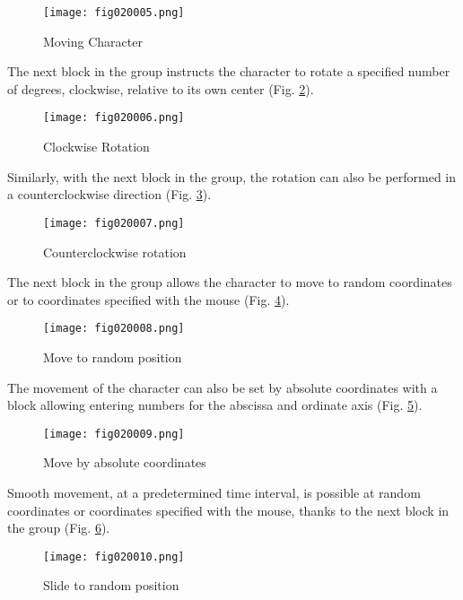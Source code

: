 \begin{figure}[H]
   \centering
   \texttt{[image: fig020005.png]}
   \caption{Moving Character}
\label{fig020005}
\end{figure}

The next block in the group instructs the character to rotate a specified number of degrees, clockwise, relative to its own center (Fig. \ref{fig020006}).

\begin{figure}[H]
   \centering
   \texttt{[image: fig020006.png]}
   \caption{Clockwise Rotation}
\label{fig020006}
\end{figure}

Similarly, with the next block in the group, the rotation can also be performed in a counterclockwise direction (Fig. \ref{fig020007}).

\begin{figure}[H]
   \centering
   \texttt{[image: fig020007.png]}
   \caption{Counterclockwise rotation}
\label{fig020007}
\end{figure}

The next block in the group allows the character to move to random coordinates or to coordinates specified with the mouse (Fig. \ref{fig020008}).

\begin{figure}[H]
   \centering
   \texttt{[image: fig020008.png]}
   \caption{Move to random position}
\label{fig020008}
\end{figure}

The movement of the character can also be set by absolute coordinates with a block allowing entering numbers for the abscissa and ordinate axis (Fig. \ref{fig020009}).

\begin{figure}[H]
   \centering
   \texttt{[image: fig020009.png]}
   \caption{Move by absolute coordinates}
\label{fig020009}
\end{figure}

Smooth movement, at a predetermined time interval, is possible at random coordinates or coordinates specified with the mouse, thanks to the next block in the group (Fig. \ref{fig020010}).

\begin{figure}[H]
   \centering
   \texttt{[image: fig020010.png]}
   \caption{Slide to random position}
\label{fig020010}
\end{figure}


